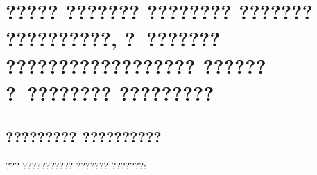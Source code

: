 \chapter{????? ??????? ???????? ??????? ??????????, ?~??????? ?????????????????? ?????? ?~???????? ?????????}\label{app:B}

\section{????????? ??????????}\label{app:B1}
??? ??????????? ??????? ???????:
\makeatletter
{} %
{%
\renewenvironment{longtable*}
  {\renewcommand\LTcaptype{}\longtable}
  {\endlongtable}
}
{
    {\addtocounter{table}{-1}}
    {}
}
\makeatother
\fontsize{10pt}{10pt}\selectfont
